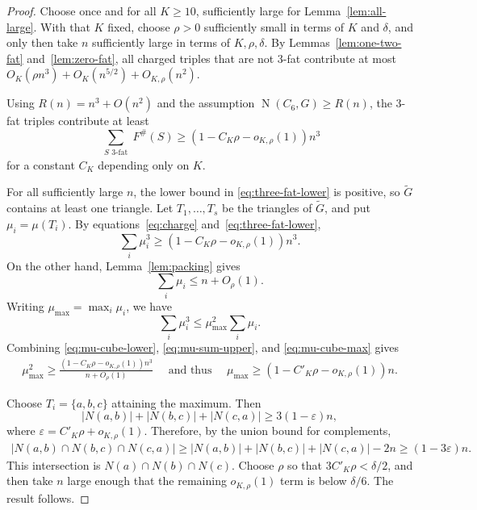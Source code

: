 \documentclass[11pt,letterpaper]{article}
\newcommand{\N}{\operatorname{N}}
\begin{document}
\begin{proof}
Choose once and for all \(K\ge10\), sufficiently large for Lemma~\ref{lem:all-large}. With that
\(K\) fixed, choose \(\rho>0\) sufficiently small
in terms of \(K\) and \(\delta\), and only then take \(n\) sufficiently large in terms of
\(K,\rho,\delta\). By Lemmas~\ref{lem:one-two-fat} and~\ref{lem:zero-fat}, all charged triples
that are not 3-fat contribute at most $O_K(\rho n^3)+O_K(n^{5/2})+O_{K,\rho}(n^2)$.

Using \(R(n)=n^3+O(n^2)\) and the assumption \(\N(C_6,G)\ge R(n)\), the 3-fat triples contribute at least
\begin{equation}\label{eq:three-fat-lower}
  \sum_{\substack{S\text{ 3-fat}}}F^\#(S)
  \ge (1-C_K\rho-o_{K,\rho}(1))n^3
\end{equation}
for a constant \(C_K\) depending only on \(K\).

For all sufficiently large \(n\), the lower bound in \eqref{eq:three-fat-lower} is positive, so \(\tilde{G}\) contains at least one
triangle. Let \(T_1,\ldots,T_s\) be the triangles of \(\tilde{G}\), and put \(\mu_i=\mu(T_i)\). By
equations~\eqref{eq:charge} and~\eqref{eq:three-fat-lower},
\begin{equation}\label{eq:mu-cube-lower}
  \sum_i\mu_i^3\ge(1-C_K\rho-o_{K,\rho}(1))n^3.
\end{equation}
On the other hand, Lemma~\ref{lem:packing} gives
\begin{equation}\label{eq:mu-sum-upper}
  \sum_i\mu_i\le n+O_\rho(1).
\end{equation}
Writing \(\mu_{\max}=\max_i\mu_i\), we have
\begin{equation}\label{eq:mu-cube-max}
  \sum_i\mu_i^3\le\mu_{\max}^2\sum_i\mu_i.
\end{equation}
Combining \eqref{eq:mu-cube-lower}, \eqref{eq:mu-sum-upper}, and \eqref{eq:mu-cube-max} gives
\begin{align*}
\mu_{\max}^2
  \ge\frac{(1-C_K\rho-o_{K,\rho}(1))n^3}{n+O_\rho(1)}
\quad\text{ and thus }\quad
  \mu_{\max}\ge(1-C'_K\rho-o_{K,\rho}(1))n.
\end{align*}
  
Choose \(T_i=\{a,b,c\}\) attaining the maximum. Then
\[
  |N(a,b)|+|N(b,c)|+|N(c,a)|\ge3(1-\varepsilon)n,
\]
where \(\varepsilon=C'_K\rho+o_{K,\rho}(1)\). Therefore, by the union bound for complements,
\begin{align*}
  |N(a,b)\cap N(b,c)\cap N(c,a)|
  \ge |N(a,b)|+|N(b,c)|+|N(c,a)|-2n
  \ge(1-3\varepsilon)n.
\end{align*}
This intersection is \(N(a)\cap N(b)\cap N(c)\). Choose \(\rho\) so that
\(3C'_K\rho<\delta/2\), and then take \(n\) large enough that the remaining \(o_{K,\rho}(1)\) term
is below \(\delta/6\). The result follows.
\end{proof}
\end{document}
